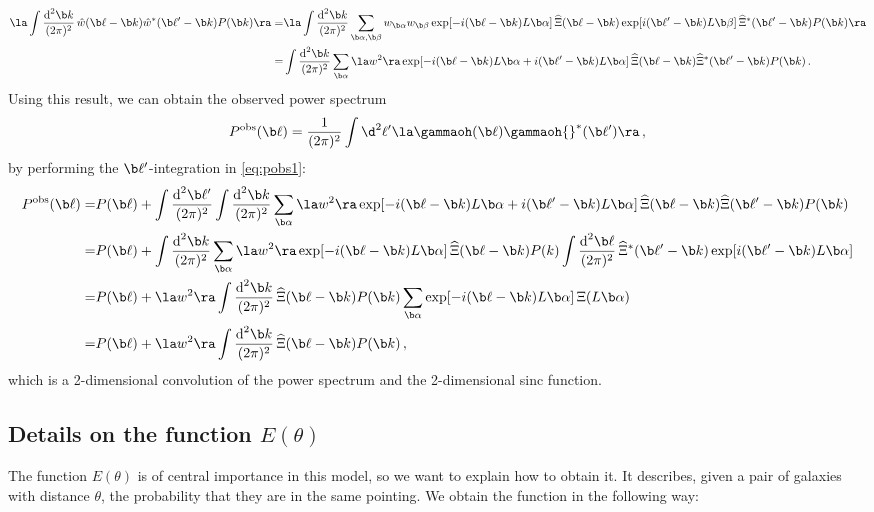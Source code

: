 \begin{align}
\la \int \frac{\text{d}^2 \b k}{(2\pi)^2}\, \hat{w}(\b \ell-\b k)\hat{w}^*(\b \ell'-\b k)P(\b k)\ra = & \la \int \frac{\text{d}^2 \b k}{(2\pi)^2} \sum_{\b \alpha,\b \beta}w_{\b \alpha}w_{\b \beta} \exp[-i(\b \ell - \b k)L\b \alpha]\, \widehat{\Xi}(\b \ell - \b k) \exp[i(\b \ell' - \b k)L\b \beta]\, \widehat{\Xi}^*(\b \ell' - \b k)P(\b k)\ra \nonumber\\
 = & \int \frac{\text{d}^2 \b k}{(2\pi)^2} \sum_{\b \alpha} \la w^2\ra \exp[-i(\b \ell - \b k)L\b \alpha + i(\b \ell' - \b k) L\b \alpha]\, \widehat{\Xi}(\b \ell - \b k)\widehat{\Xi}^*(\b \ell' - \b k)P(\b k) \, .
\end{align}
Using this result, we can obtain the observed power spectrum \begin{equation}
P^{\rm{obs}}(\b\ell) = \frac{1}{(2\pi)^2}\int\d^2\ell' \la \gammaoh(\b \ell) \gammaoh {}^*(\b \ell')\ra\, ,
\end{equation}
by performing the $\b \ell'$-integration in \eqref{eq:pobs1}:
\begin{align}
P^{\text{obs}}(\b \ell) = & P(\b \ell)+\int \frac{\text{d}^2\b \ell'}{(2\pi)^2} \int\frac{\text{d}^2\b k}{(2\pi)^2}\sum_{\b \alpha}\la w^2\ra \exp[-i(\b \ell-\b k)L\b \alpha+i(\b \ell'-\b k)L\b \alpha]\, \widehat{\Xi}(\b \ell-\b k)\widehat{\Xi}(\b \ell' - \b k) P(\b k) \nonumber\\
= & P(\b \ell)+ \int\frac{\text{d}^2\b k}{(2\pi)^2}\sum_{\b \alpha}\la w^2\ra \exp[-i(\b \ell-\b k)L\b \alpha]\, \widehat{\Xi}(\b \ell - \b k)P(k) \int\frac{\text{d}^2\b \ell}{(2\pi)^2}\, \widehat{\Xi}^*(\b \ell'-\b k)\exp[i(\b \ell'- \b k)L\b \alpha] \nonumber\\
 = & P(\b \ell) + \la w^2\ra \int\frac{\text{d}^2\b k}{(2\pi)^2}\, \widehat{\Xi}(\b \ell-\b k)P(\b k) \sum_{\b \alpha}\exp[-i(\b \ell - \b k)L\b \alpha]\,\Xi(L\b \alpha) \nonumber\\
 = & P(\b \ell) + \la w^2\ra \int\frac{\text{d}^2\b k}{(2\pi)^2}\,\widehat{\Xi}(\b \ell-\b k)P(\b k)\, ,
\end{align}
which is a 2-dimensional convolution of the power spectrum and the 2-dimensional sinc function.
\label{sec:calc of PS}
\subsection{Details on the function $E(\theta)$}
\label{sec:details on etheta}
The function $E(\theta)$ is of central importance in this model, so we want to explain how to obtain it. It describes, given a pair of galaxies with distance $\theta$, the probability that they are in the same pointing. We obtain the function in the following way:

